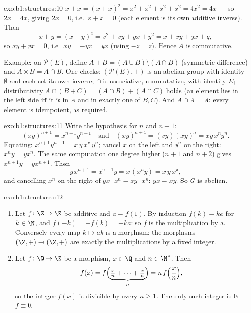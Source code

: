 \begin{solution}{exo:b1:structures:10}
$x + x = (x + x)^2 = x^2 + x^2 + x^2 + x^2 = 4x^2 = 4x$ --- so $2x =
4x$, giving $2x = 0$, i.e.\ $x + x = 0$ (each element is its own
additive inverse). Then
\[
x + y = (x+y)^2 = x^2 + xy + yx + y^2 = x + xy + yx + y ,
\]
so $xy + yx = 0$, i.e.\ $xy = -yx = yx$ (using $-z = z$). Hence $A$ is
commutative.

Example: on $\mathcal{P}(E)$, define $A + B = (A \cup B) \setminus (A
\cap B)$ (symmetric difference) and $A \times B = A \cap B$. One
checks: $(\mathcal{P}(E), +)$ is an abelian group with identity
$\emptyset$ and each set its own inverse; $\cap$ is associative,
commutative, with identity $E$; distributivity $A \cap (B + C) = (A
\cap B) + (A \cap C)$ holds (an element lies in the left side iff it
is in $A$ and in exactly one of $B, C$). And $A \cap A = A$: every
element is idempotent, as required.
\end{solution}

\begin{solution}{exo:b1:structures:11}
Write the hypothesis for $n$ and $n+1$:
\[
(xy)^{n+1} = x^{n+1} y^{n+1}
\quad\text{and}\quad
(xy)^{n+1} = (xy)(xy)^n = xy\,x^n y^n .
\]
Equating: $x^{n+1} y^{n+1} = x\,y\,x^n\,y^n$; cancel $x$ on the left
and $y^n$ on the right: $x^n y = y x^n$. The same computation one
degree higher ($n+1$ and $n+2$) gives $x^{n+1} y = y x^{n+1}$. Then
\[
y\,x^{n+1} = x^{n+1} y = x\,(x^n y) = x\,y\,x^n ,
\]
and cancelling $x^n$ on the right of $y x \cdot x^n = x y \cdot x^n$:
$yx = xy$. So $G$ is abelian.
\end{solution}

\begin{solution}{exo:b1:structures:12}
\begin{enumerate}
  \item Let $f \colon \Z \to \Z$ be additive and $a = f(1)$. By
        induction $f(k) = ka$ for $k \in \N$, and $f(-k) = -f(k) =
        -ka$: so $f$ is the multiplication by $a$. Conversely
        every map $k \mapsto ak$ is a morphism: the morphisms
        $(\Z,+) \to (\Z,+)$ are exactly the multiplications by a
        fixed integer.
  \item Let $f \colon \Q \to \Z$ be a morphism, $x \in \Q$ and
        $n \in \N^*$. Then
        \[
        f(x) = f\Bigl(\underbrace{\tfrac xn + \dots +
        \tfrac xn}_{n}\Bigr) = n\,f\Bigl(\frac xn\Bigr) ,
        \]
        so the integer $f(x)$ is divisible by every $n \geq 1$.
        The only such integer is $0$: $f \equiv 0$.
\end{enumerate}
\end{solution}

